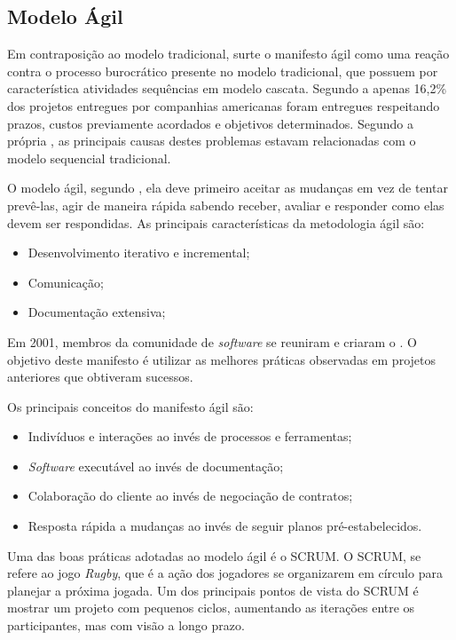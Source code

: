 \subsection{Modelo Ágil}

Em contraposição ao modelo tradicional, surte o manifesto ágil como uma reação contra o processo burocrático presente no modelo tradicional, que possuem por característica atividades sequências em modelo cascata. Segundo a \cite{chaos} apenas 16,2\% dos projetos entregues por companhias americanas foram entregues respeitando prazos, custos previamente acordados e objetivos determinados. Segundo a própria \cite{chaos}, as principais causas destes problemas estavam relacionadas com o modelo sequencial tradicional.

O modelo ágil, segundo \cite{soares}, ela deve primeiro aceitar as mudanças em vez de tentar prevê-las, agir de maneira rápida sabendo receber, avaliar e responder como elas devem ser respondidas. As principais características da metodologia ágil são:

\begin{itemize}
	\item Desenvolvimento iterativo e incremental;
	\item Comunicação;
	\item Documentação extensiva; 
\end{itemize}

Em 2001, membros da comunidade de \textit{software} se reuniram e criaram o \cite{agile_manifest}. O objetivo deste manifesto é utilizar as melhores práticas observadas em projetos anteriores que obtiveram sucessos.

Os principais conceitos do manifesto ágil são:

\begin{itemize}
	\item Indivíduos e interações ao invés de processos e ferramentas;
	\item \textit{Software} executável ao invés de documentação;
	\item Colaboração do cliente ao invés de negociação de contratos;
	\item Resposta rápida a mudanças ao invés de seguir planos pré-estabelecidos.
\end{itemize}

Uma das boas práticas adotadas ao modelo ágil é o SCRUM. O SCRUM, se refere ao jogo \textit{Rugby}, que é a ação dos jogadores se organizarem em círculo para planejar a próxima jogada. Um dos principais pontos de vista do SCRUM é mostrar um projeto com pequenos ciclos, aumentando as iterações entre os participantes, mas com visão a longo prazo.

